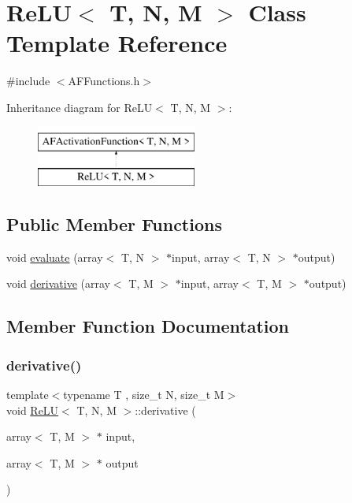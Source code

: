 \hypertarget{class_re_l_u}{}\section{Re\+LU$<$ T, N, M $>$ Class Template Reference}
\label{class_re_l_u}


{\ttfamily \#include $<$A\+F\+Functions.\+h$>$}

Inheritance diagram for Re\+LU$<$ T, N, M $>$\+:\begin{figure}[H]
\begin{center}
\leavevmode
\includegraphics[height=2.000000cm]{class_re_l_u}
\end{center}
\end{figure}
\subsection*{Public Member Functions}
\begin{DoxyCompactItemize}
\item 
void \hyperlink{class_re_l_u_a0e184c2046dcbe4c6af8805974f9b622}{evaluate} (array$<$ T, N $>$ $\ast$input, array$<$ T, N $>$ $\ast$output)
\item 
void \hyperlink{class_re_l_u_a3be0a967285f5b26aa09f0acb7220c85}{derivative} (array$<$ T, M $>$ $\ast$input, array$<$ T, M $>$ $\ast$output)
\end{DoxyCompactItemize}


\subsection{Member Function Documentation}
\mbox{\label{class_re_l_u_a3be0a967285f5b26aa09f0acb7220c85}} 
\subsubsection{\texorpdfstring{derivative()}{derivative()}}
{\footnotesize\ttfamily template$<$typename T , size\+\_\+t N, size\+\_\+t M$>$ \\
void \hyperlink{class_re_l_u}{Re\+LU}$<$ T, N, M $>$\+::derivative (\begin{DoxyParamCaption}\item[{array$<$ T, M $>$ $\ast$}]{input,  }\item[{array$<$ T, M $>$ $\ast$}]{output }\end{DoxyParamCaption})\hspace{0.3cm}{\ttfamily [inline]}}

